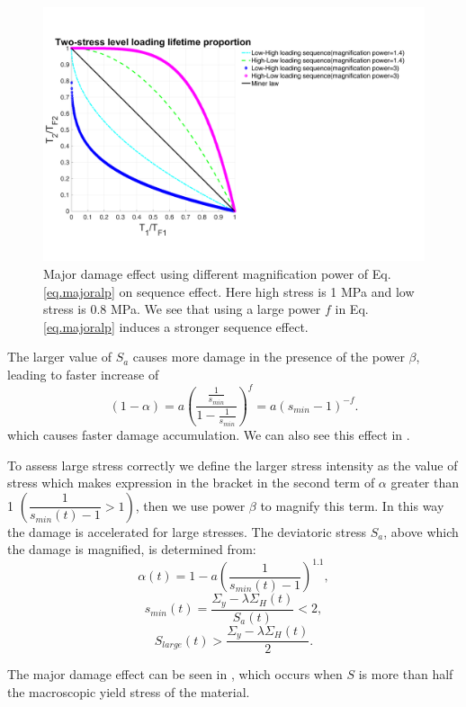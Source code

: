 \begin{figure}[!h]
\centering
\includegraphics[width=\textwidth]{figures//sequence_ours.png} 
\caption{Major damage effect using different magnification power of Eq.\eqref{eq.majoralp} on sequence effect. Here high stress is 1 MPa and low stress is 0.8 MPa. We see that using a large power $f$ in Eq.\eqref{eq.majoralp} induces a stronger sequence effect.}
\label{fig.sequenceours}
\end{figure}

The larger value of $S_{a}$ causes more damage in the presence of the power $\beta$, leading to faster increase of 
$$(1-\alpha)=a\left(  \dfrac{\frac{1}{s_{min}}}{1-\frac{1}{s_{min}}} \right) ^{f}=a(s_{min}-1)^{-f}.$$ 
which causes faster damage accumulation. We can also see this effect in . 

To assess large stress correctly we define the larger stress intensity as the value of stress which makes expression in the bracket in the second term of $\alpha$ greater than 1 $ \left(  \dfrac{1}{ s_{min}(t)-1 }>1\right) $, then we use power $\beta$ to magnify this term. In this way the damage is accelerated for large stresses. The deviatoric stress $S_{a}$, above which the damage is magnified,  is determined from: 
$$\alpha(t)=1-a\left( \dfrac{1}{ s_{min}(t)-1 } \right)^{1.1},$$
$$s_{min}(t)=\dfrac{\Sigma_y-\lambda \Sigma_H(t)}{S_{a}(t)}<2,$$
$$S_{large}(t)>\dfrac{\Sigma_y-\lambda \Sigma_H(t)}{2}.$$ 

The major damage effect can be seen in , which occurs when $S$ is more than half the macroscopic yield stress of the material.

